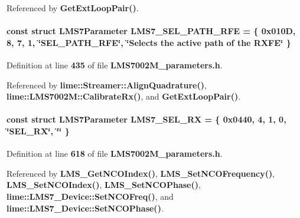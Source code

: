 Referenced by {\bf Get\+Ext\+Loop\+Pair()}.

\paragraph[{L\+M\+S7\+\_\+\+S\+E\+L\+\_\+\+P\+A\+T\+H\+\_\+\+R\+FE}]{\setlength{\rightskip}{0pt plus 5cm}const struct {\bf L\+M\+S7\+Parameter} L\+M\+S7\+\_\+\+S\+E\+L\+\_\+\+P\+A\+T\+H\+\_\+\+R\+FE = \{ 0x010\+D, 8, 7, 1, \char`\"{}\+S\+E\+L\+\_\+\+P\+A\+T\+H\+\_\+\+R\+F\+E\char`\"{}, \char`\"{}\+Selects the active path of the R\+X\+F\+E\char`\"{} \}\hspace{0.3cm}{\ttfamily [static]}}\label{LMS7002M__parameters_8h_ac3abed20dd6d03ddfba3d0cc4c11ff96}


Definition at line {\bf 435} of file {\bf L\+M\+S7002\+M\+\_\+parameters.\+h}.



Referenced by {\bf lime\+::\+Streamer\+::\+Align\+Quadrature()}, {\bf lime\+::\+L\+M\+S7002\+M\+::\+Calibrate\+Rx()}, and {\bf Get\+Ext\+Loop\+Pair()}.

\paragraph[{L\+M\+S7\+\_\+\+S\+E\+L\+\_\+\+RX}]{\setlength{\rightskip}{0pt plus 5cm}const struct {\bf L\+M\+S7\+Parameter} L\+M\+S7\+\_\+\+S\+E\+L\+\_\+\+RX = \{ 0x0440, 4, 1, 0, \char`\"{}\+S\+E\+L\+\_\+\+R\+X\char`\"{}, \char`\"{}\char`\"{} \}\hspace{0.3cm}{\ttfamily [static]}}\label{LMS7002M__parameters_8h_a477e8442fc2a968bd39c47e0ed08481e}


Definition at line {\bf 618} of file {\bf L\+M\+S7002\+M\+\_\+parameters.\+h}.



Referenced by {\bf L\+M\+S\+\_\+\+Get\+N\+C\+O\+Index()}, {\bf L\+M\+S\+\_\+\+Set\+N\+C\+O\+Frequency()}, {\bf L\+M\+S\+\_\+\+Set\+N\+C\+O\+Index()}, {\bf L\+M\+S\+\_\+\+Set\+N\+C\+O\+Phase()}, {\bf lime\+::\+L\+M\+S7\+\_\+\+Device\+::\+Set\+N\+C\+O\+Freq()}, and {\bf lime\+::\+L\+M\+S7\+\_\+\+Device\+::\+Set\+N\+C\+O\+Phase()}.

